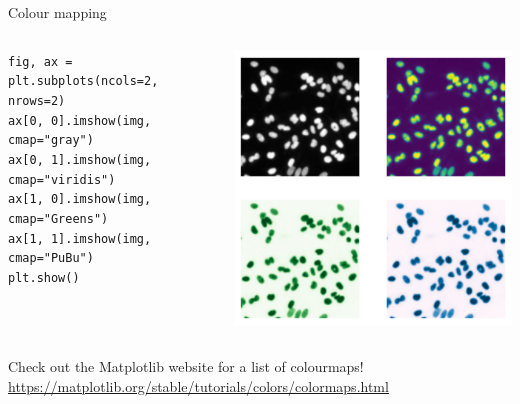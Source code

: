 \documentclass[9pt, aspectratio=169]{beamer}
\begin{document}
\begin{frame}
    {Colour mapping}
    \begin{columns}
        \begin{column}{0.6\textwidth}
            \begin{codebox}
                \texttt{fig, ax = plt.subplots(ncols=2, nrows=2)\\
                    ax[0, 0].imshow(img, cmap="gray")\\
                    ax[0, 1].imshow(img, cmap="viridis")\\
                    ax[1, 0].imshow(img, cmap="Greens")\\
                    ax[1, 1].imshow(img, cmap="PuBu")\\
                    plt.show()}
            \end{codebox}
        \end{column}
        \begin{column}{0.4\textwidth}
            \includegraphics[width=\textwidth]{nuclei_cmapped.png}
        \end{column}
    \end{columns}
    \centering

    Check out the Matplotlib website for a list of colourmaps! \url{https://matplotlib.org/stable/tutorials/colors/colormaps.html}

\end{frame}
\end{document}
